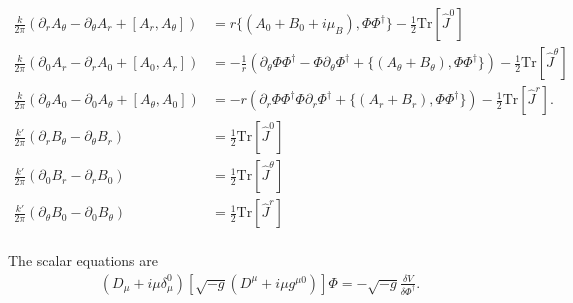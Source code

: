 \begin{align}
    \frac{k}{2\pi} \left(\partial_r A_{\theta} - \partial_{\theta} A_r + [A_r, A_{\theta}]\right) &= r \big\lbrace (A_0 +B_0+ i \mu_B ) , \Phi \Phi^{\dag} \big\rbrace - \frac{1}{2} \mathrm{Tr} \left[ \hat{J}^0 \right] \\
    \frac{k}{2\pi} \left(\partial_0 A_r - \partial_r A_0 + [A_0, A_r]\right) &= -\frac{1}{r} \left(\partial_{\theta} \Phi \Phi^{\dag} -\Phi \partial_{\theta}\Phi^{\dag} + \big\lbrace (A_{\theta} +B_{\theta}), \Phi \Phi^{\dag} \big\rbrace \right) - \frac{1}{2} \mathrm{Tr} \left[ \hat{J}^{\theta} \right]\\
    \frac{k}{2 \pi} \left(\partial_{\theta} A_0 - \partial_{0} A_{\theta} + [A_{\theta}, A_0]\right) &=-r \left(\partial_{r} \Phi \Phi^{\dag} \Phi \partial_r \Phi^{\dag} + \big\lbrace (A_r +B_r), \Phi \Phi^{\dag} \big\rbrace \right) - \frac{1}{2} \mathrm{Tr} \left[ \hat{J}^r \right]. \\
    \frac{k'}{2 \pi} \left( \partial_r B_{\theta}- \partial_{\theta} B_r\right) &= \frac{1}{2} \mathrm{Tr} [\hat{J}^0]\\
    \frac{k'}{2 \pi} \left( \partial_0 B_{r}- \partial_{r} B_0\right) &= \frac{1}{2} \mathrm{Tr} [\hat{J}^{\theta}]\\
    \frac{k'}{2 \pi} \left( \partial_{\theta} B_{0}- \partial_{0} B_{\theta}\right) &= \frac{1}{2} \mathrm{Tr} [\hat{J}^r]\\
\end{align}


The scalar equations are 
\begin{align}
    \left(D_{\mu} + i\mu \delta_{\mu}^0 \right) \left[\sqrt{-g} \left(D^{\mu}+i \mu g^{\mu 0}\right)\right] \Phi = - \sqrt{-g} \frac{\delta V}{\delta \Phi^{\dag}}. \label{eq:U2_scalar_EOM}
\end{align}


